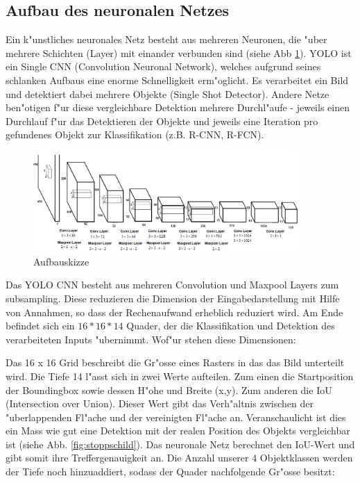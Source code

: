 \subsection{Aufbau des neuronalen Netzes}
\label{sec:cnn_aufbau}
Ein k"unstliches neuronales Netz besteht aus mehreren Neuronen, die "uber mehrere Schichten (Layer) mit einander verbunden sind (siehe Abb \ref{fig:neunet}). YOLO ist ein Single CNN (Convolution Neuronal Network), welches aufgrund seines schlanken Aufbaus eine enorme Schnelligkeit erm"oglicht. Es verarbeitet ein Bild und detektiert dabei mehrere Objekte (Single Shot Detector). Andere Netze ben"otigen f"ur diese vergleichbare Detektion mehrere Durchl"aufe - jeweils einen Durchlauf f"ur das Detektieren der Objekte und jeweils eine Iteration pro gefundenes Objekt zur Klassifikation (z.B. R-CNN, R-FCN).

\begin{figure}[h]
	\centering
	\includegraphics[width=0.90\textwidth]{images/aufbauskizze}
	\caption{Aufbauskizze}
	\label{fig:neunet}
\end{figure}

Das YOLO CNN besteht aus mehreren Convolution und Maxpool Layers zum subsampling. Diese reduzieren die Dimension der Eingabedarstellung mit Hilfe von Annahmen, so dass der Rechenaufwand erheblich reduziert wird. Am Ende befindet sich ein $16*16*14$ Quader, der die Klassifikation und Detektion des verarbeiteten Inputs "ubernimmt. Wof"ur stehen diese Dimensionen:

Das 16 x 16 Grid beschreibt die Gr"osse eines Rasters in das das Bild unterteilt wird. Die Tiefe 14 l"asst sich in zwei Werte aufteilen. Zum einen die Startposition der Boundingbox sowie dessen H"ohe und Breite (x,y).  Zum anderen die IoU (Intersection over Union). Dieser Wert gibt das Verh"altnis zwischen der "uberlappenden Fl"ache und der vereinigten Fl"ache an. Veranschaulicht ist dies ein Mass wie gut eine Detektion mit der realen Position des Objekts vergleichbar ist (siehe Abb. \ref{fig:stoppschild}). Das neuronale Netz berechnet den IoU-Wert und gibt somit ihre Treffergenauigkeit an. Die Anzahl unserer 4 Objektklassen werden der Tiefe noch hinzuaddiert, sodass der Quader nachfolgende Gr"osse besitzt:
	
